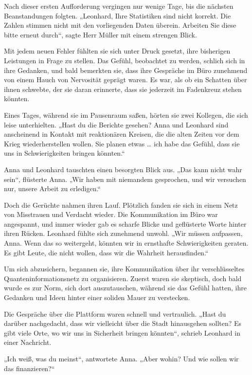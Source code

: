 \documentclass[
]{article}
\begin{document}
Nach dieser ersten Aufforderung vergingen nur wenige Tage, bis die
nächsten Beanstandungen folgten. „Leonhard, Ihre Statistiken sind nicht
korrekt. Die Zahlen stimmen nicht mit den vorliegenden Daten überein.
Arbeiten Sie diese bitte erneut durch``, sagte Herr Müller mit einem
strengen Blick.

Mit jedem neuen Fehler fühlten sie sich unter Druck gesetzt, ihre
bisherigen Leistungen in Frage zu stellen. Das Gefühl, beobachtet zu
werden, schlich sich in ihre Gedanken, und bald bemerkten sie, dass ihre
Gespräche im Büro zunehmend von einem Hauch von Nervosität geprägt
waren. Es war, als ob ein Schatten über ihnen schwebte, der sie daran
erinnerte, dass sie jederzeit im Fadenkreuz stehen könnten.

Eines Tages, während sie im Pausenraum saßen, hörten sie zwei Kollegen,
die sich leise unterhielten. „Hast du die Berichte gesehen? Anna und
Leonhard sind anscheinend in Kontakt mit reaktionären Kreisen, die die
alten Zeiten vor dem Krieg wiederherstellen wollen. Sie planen etwas
\ldots{} ich habe das Gefühl, dass sie uns in Schwierigkeiten bringen
könnten.``

Anna und Leonhard tauschten einen besorgten Blick aus. „Das kann nicht
wahr sein``, flüsterte Anna. „Wir haben mit niemandem gesprochen, und
wir versuchen nur, unsere Arbeit zu erledigen.``

Doch die Gerüchte nahmen ihren Lauf. Plötzlich fanden sie sich in einem
Netz von Misstrauen und Verdacht wieder. Die Kommunikation im Büro war
angespannt, und immer wieder gab es scharfe Blicke und geflüsterte Worte
hinter ihren Rücken. Leonhard fühlte sich zunehmend unwohl. „Wir müssen
aufpassen, Anna. Wenn das so weitergeht, könnten wir in ernsthafte
Schwierigkeiten geraten. Es gibt Leute, die nicht wollen, dass wir die
Wahrheit herausfinden.``

Um sich abzusichern, begannen sie, ihre Kommunikation über ihr
verschlüsseltes Quanteninformationsnetz zu organisieren. Zuerst waren
sie skeptisch, doch bald wurde es zur Norm, sich dort auszutauschen,
während sie das Gefühl hatten, ihre Gedanken und Ideen hinter einer
soliden Mauer zu verstecken.

Die Gespräche über die Plattform waren schnell und vertraulich. „Hast du
darüber nachgedacht, dass wir vielleicht über die Stadt hinausgehen
sollten? Es gibt viele Orte, wo wir uns in Sicherheit bringen könnten``,
schrieb Leonhard in einer Nachricht.

„Ich weiß, was du meinst``, antwortete Anna. „Aber wohin? Und wie sollen
wir das finanzieren?{\kern0pt}``
\end{document}
